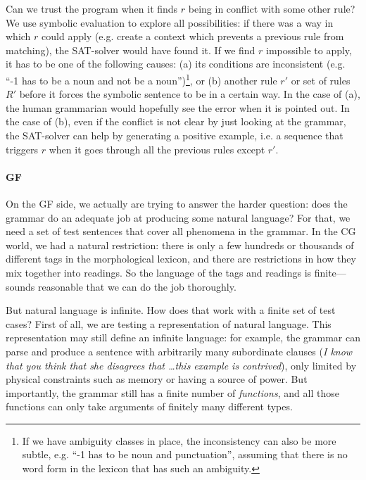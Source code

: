 Can we trust the program when it finds $r$ being in conflict with some
other rule? We use symbolic evaluation to explore all possibilities:
if there was a way in which $r$ could apply (e.g. create a context
which prevents a previous rule from matching), the SAT-solver would
have found it. If we find $r$ impossible to apply, it has to be one of
the following causes: (a) its conditions are inconsistent (e.g. ``-1
has to be a noun and not be a noun'')\footnote{If we have ambiguity
  classes in place, the inconsistency can also be more subtle,
  e.g. ``-1 has to be noun and punctuation'', assuming that there is
  no word form in the lexicon that has such an ambiguity.}, or (b)
another rule $r'$ or set of rules $R'$ before it forces the symbolic
sentence to be in a certain way. In the case of (a), the human
grammarian would hopefully see the error when it is pointed out. In
the case of (b), even if the conflict is not clear by just looking at
the grammar, the SAT-solver can help by generating a positive example,
i.e. a sequence that triggers $r$ when it goes through all the
previous rules except $r'$.


\paragraph{GF} On the GF side, we actually are trying to answer the
harder question: does the grammar do an adequate job at producing
some natural language? For that, we need a set of test sentences that
cover all phenomena in the grammar. In the CG world, we had a natural
restriction: there is only a few hundreds or thousands of different
tags in the morphological lexicon, and there are restrictions in how
they mix together into readings. So the language of the tags and
readings is finite---sounds reasonable that we can do the job
thoroughly.

But natural language is infinite. How does that work with a finite set
of test cases? First of all, we are testing a \pmcfg{} representation
of natural language. This representation may still define an infinite
language: for example, the grammar can parse and produce a sentence
with arbitrarily many subordinate clauses (\emph{I know that you think
  that she disagrees that \dots this example is contrived}), only
limited by physical constraints such as memory or having a source of
power. But importantly, the grammar still has a
finite number of \emph{functions}, and all those functions can only
take arguments of finitely many different types.

